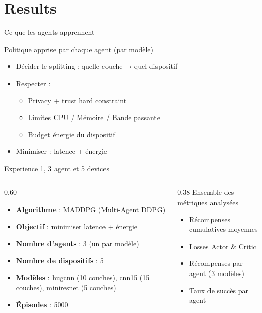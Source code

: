 \documentclass[10pt,aspectratio=169]{beamer}
\begin{document}
\section{Results}
\begin{frame}{Ce que les agents apprennent}
\begin{block}{Politique apprise par chaque agent (par modèle)}
    \begin{itemize}
        \item Décider le \alert{splitting} : quelle couche → quel dispositif
        \item Respecter :
        \begin{itemize}
            \item Privacy + trust hard constraint
            \item Limites CPU / Mémoire / Bande passante
            \item Budget énergie du dispositif
        \end{itemize}
        \item Minimiser : \alert{latence + énergie}
    \end{itemize}
\end{block}

\end{frame}

\begin{frame}{Experience 1, 3 agent et 5 devices}
\begin{columns}
    \begin{column}{0.60\textwidth}
        \begin{itemize}
    \item \textbf{Algorithme} : MADDPG (Multi-Agent DDPG)
    \item \textbf{Objectif} : minimiser latence + énergie
    \item \textbf{Nombre d'agents} : 3 (un par modèle)
    \item \textbf{Nombre de dispositifs} : 5
    \item \textbf{Modèles} : hugcnn (10 couches), cnn15 (15 couches), miniresnet (5 couches)
    \item \textbf{Épisodes} : 5000
\end{itemize}
    \end{column}
    \begin{column}{0.38\textwidth}
        Ensemble des métriques analysées
        \begin{itemize}
            \item Récompenses cumulatives moyennes
            \item Losses Actor \& Critic
            \item Récompenses par agent (3 modèles)
            \item Taux de succès par agent
        \end{itemize}
    \end{column}
\end{columns}
\end{frame}
\end{document}
